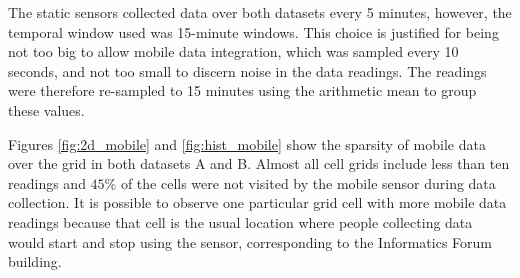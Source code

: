 The static sensors collected data over both datasets every 5 minutes, however, the temporal window used was 15-minute windows. This choice is justified for being not too big to allow mobile data integration, which was sampled every 10 seconds, and not too small to discern noise in the data readings. The readings were therefore re-sampled to 15 minutes using the arithmetic mean to group these values.


Figures \ref{fig:2d_mobile} and \ref{fig:hist_mobile} show the sparsity of mobile data over the grid in both datasets A and B. Almost all cell grids include less than ten readings and $45\%$ of the cells were not visited by the mobile sensor during data collection. It is possible to observe one particular grid cell with more mobile data readings because that cell is the usual location where people collecting data would start and stop using the sensor, corresponding to the Informatics Forum building. 

